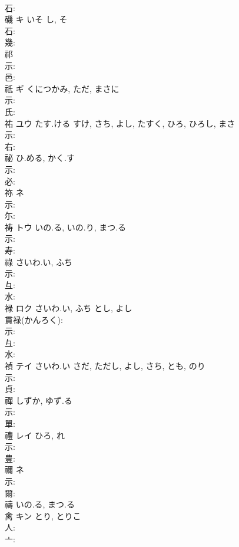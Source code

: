 \documentclass[8pt]{extreport}
\begin{document}
\begin{CJK}{UTF8}{min}
\\	石: 
\\	磯	キ	いそ	し, そ	
\\	石: 
\\	幾: 
\\	祁						
\\	示: 
\\	邑: 
\\	祇	ギ	くにつかみ, ただ, まさに		
\\	示: 
\\	氏: 
\\	祐	ユウ	たす.ける	すけ, さち, よし, たすく, ひろ, ひろし, まさ	
\\	示: 
\\	右: 
\\	祕		ひ.める, かく.す				
\\	示: 
\\	必: 
\\	祢	ネ			
\\	示: 
\\	尓: 
\\	祷	トウ	いの.る, いの.り, まつ.る		
\\	示: 
\\	寿: 
\\	祿		さいわ.い, ふち				
\\	示: 
\\	彑: 
\\	水: 
\\	禄	ロク	さいわ.い, ふち	とし, よし	
\\	貫禄(かんろく): 
\\	示: 
\\	彑: 
\\	水: 
\\	禎	テイ	さいわ.い	さだ, ただし, よし, さち, とも, のり	
\\	示: 
\\	貞: 
\\	禪		しずか, ゆず.る				
\\	示: 
\\	單: 
\\	禮	レイ		ひろ, れ			
\\	示: 
\\	豊: 
\\	禰	ネ			
\\	示: 
\\	爾: 
\\	禱		いの.る, まつ.る				
\\	禽	キン	とり, とりこ		
\\	人: 
\\	亠: 

\end{CJK}
\end{document}
